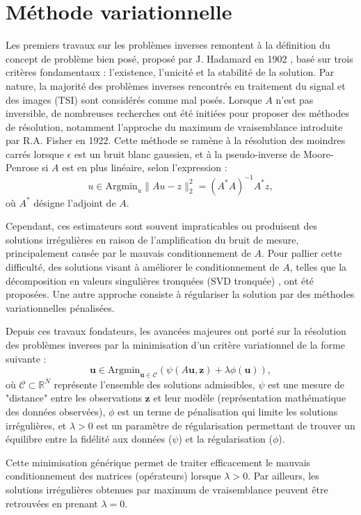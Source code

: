 \documentclass[a4paper, 12pt]{report} %
\begin{document}
\section{Méthode variationnelle}
Les premiers travaux sur les problèmes inverses remontent à la définition du concept de problème bien posé, proposé par J. Hadamard en 1902 \cite{hadamard1902problemes}, basé sur trois critères fondamentaux : l’existence, l’unicité et la stabilité de la solution. Par nature, la majorité des problèmes inverses rencontrés en traitement du signal et des images (TSI) sont considérés comme mal posés. Lorsque \( A \) n’est pas inversible, de nombreuses recherches ont été initiées pour proposer des méthodes de résolution, notamment l’approche du maximum de vraisemblance introduite par R.A. Fisher en 1922. Cette méthode se ramène à la résolution des moindres carrés lorsque \( \epsilon \) est un bruit blanc gaussien, et à la pseudo-inverse de Moore-Penrose si \( A \) est en plus linéaire, selon l’expression :
\[
u \in \text{Argmin}_u \|Au - z\|_2^2 = (A^*A)^{-1}A^*z,
\]
où \( A^* \) désigne l’adjoint de \( A \).

Cependant, ces estimateurs sont souvent impraticables ou produisent des solutions irrégulières en raison de l’amplification du bruit de mesure, principalement causée par le mauvais conditionnement de \( A \). Pour pallier cette difficulté, des solutions visant à améliorer le conditionnement de \( A \), telles que la décomposition en valeurs singulières tronquées (SVD tronquée) \cite{hansen1998rank}, ont été proposées. Une autre approche consiste à régulariser la solution par des méthodes variationnelles pénalisées.

Depuis ces travaux fondateurs, les avancées majeures ont porté sur la résolution des problèmes inverses par la minimisation d’un critère variationnel de la forme suivante :
\[
\mathbf{u} \in \text{Argmin}_{\mathbf{u} \in \mathcal{C}} \left( \psi(A\mathbf{u}, \mathbf{z}) + \lambda \phi(\mathbf{u}) \right), \tag{2}
\]
où \( \mathcal{C} \subset \mathbb{R}^N \) représente l’ensemble des solutions admissibles, \( \psi \) est une mesure de "distance" entre les observations \( \mathbf{z} \) et leur modèle (représentation mathématique des données observées), \( \phi \) est un terme de pénalisation qui limite les solutions irrégulières, et \( \lambda > 0 \) est un paramètre de régularisation permettant de trouver un équilibre entre la fidélité aux données (\( \psi \)) et la régularisation (\( \phi \)).

Cette minimisation générique permet de traiter efficacement le mauvais conditionnement des matrices (opérateurs) lorsque \( \lambda > 0 \). Par ailleurs, les solutions irrégulières obtenues par maximum de vraisemblance peuvent être retrouvées en prenant \( \lambda = 0 \).
\end{document}
